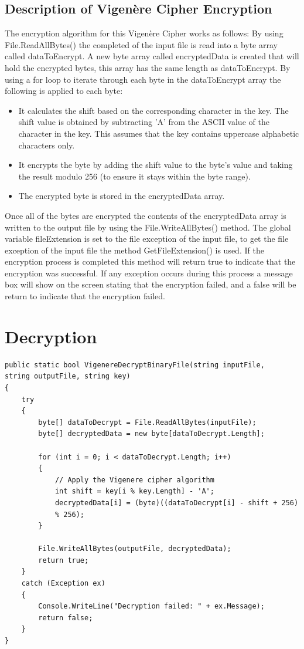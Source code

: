 \documentclass[a4paper,oneside,11pt]{book}
\begin{document}
\subsection{Description of Vigenère Cipher Encryption}

The encryption algorithm for this Vigenère Cipher works as follows:
By using File.ReadAllBytes() the completed of the input file is read into a byte array called dataToEncrypt. A new byte array called encryptedData is created that will hold the encrypted bytes, this array has the same length as dataToEncrypt. By using a for loop to iterate through each byte in the dataToEncrypt array the following is applied to each byte:
\begin{itemize}
    \item 
        It calculates the shift based on the corresponding character in the key. The shift value is obtained by subtracting 'A' from the ASCII value of the character in the key. This assumes that the key contains uppercase alphabetic characters only.
    \item 
        It encrypts the byte by adding the shift value to the byte's value and taking the result modulo 256 (to ensure it stays within the byte range).
    \item 
        The encrypted byte is stored in the encryptedData array.
\end{itemize}
Once all of the bytes are encrypted the contents of the encryptedData array is written to the output file by using the File.WriteAllBytes() method. The global variable fileExtension is set to the file exception of the input file, to get the file exception of the input file the method GetFileExtension() is used. If the encryption process is completed this method will return true to indicate that the encryption was successful. If any exception occurs during this process a message box will show on the screen stating that the encryption failed, and a false will be return to indicate that the encryption failed.

\section{Decryption}

\begin{lstlisting}[language=Csh, caption={Code for Vigenère Cipher Decryption}]
public static bool VigenereDecryptBinaryFile(string inputFile, 
string outputFile, string key)
{
    try
    {
        byte[] dataToDecrypt = File.ReadAllBytes(inputFile);
        byte[] decryptedData = new byte[dataToDecrypt.Length];

        for (int i = 0; i < dataToDecrypt.Length; i++)
        {
            // Apply the Vigenere cipher algorithm
            int shift = key[i % key.Length] - 'A';
            decryptedData[i] = (byte)((dataToDecrypt[i] - shift + 256)
            % 256);
        }

        File.WriteAllBytes(outputFile, decryptedData);
        return true;
    }
    catch (Exception ex)
    {
        Console.WriteLine("Decryption failed: " + ex.Message);
        return false;
    }
}
\end{lstlisting}
\end{document}
